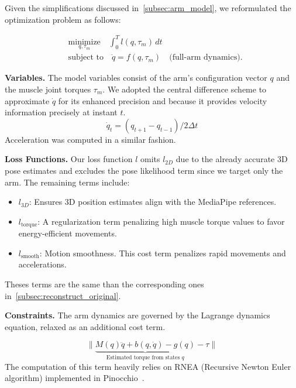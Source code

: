 Given the simplifications discussed in~\cref{subsec:arm_model}, we reformulated the optimization problem as follows:

\begin{equation*}
    \begin{aligned}
        & \underset{q,\tau_m}{\text{minimize}} \quad \int_{0}^{T} l(q, \tau_m)\, dt \\
        & \text{subject to} \quad \dot{q} = f(q, \tau_m) \quad \text{(full-arm dynamics)}.
    \end{aligned}
\end{equation*}

\noindent\textbf{Variables.} The model variables consist of the arm's configuration vector \(q\) and the muscle joint torques \(\tau_m\). 
We adopted the central difference scheme to approximate \(\dot{q}\) for its enhanced precision and because it provides velocity information precisely 
at instant \(t\).
\[
    \dot{q}_t = (q_{t + 1} - q_{t - 1}) / 2\Delta t
\]
Acceleration was computed in a similar fashion.

\noindent\textbf{Loss Functions.} Our loss function \(l\) omits \(l_{2D}\) due to the already accurate 3D pose estimates and 
excludes the pose likelihood term since we target only the arm. The remaining terms include:

\begin{itemize}
    \item 
        \(l_{3D}\): Ensures 3D position estimates align with the MediaPipe references.
    \item
        \(l_{\text{torque}}\): A regularization term penalizing high muscle torque values to favor energy-efficient movements.
    \item 
        \(l_{\text{smooth}}\): Motion smoothness.
        This cost term penalizes rapid movements and accelerations.
\end{itemize}

Theses terms are the same than the corresponding ones in~\cref{subsec:reconstruct_original}.

\noindent\textbf{Constraints.} The arm dynamics are governed by the Lagrange dynamics equation,
relaxed as an additional cost term.

\[
    \| \underbrace{M(q)\ddot{q} + b(q, \dot{q}) - g(q)}_{\textrm{Estimated torque from states $q$}} - \tau \|
\]
The computation of this term heavily relies on RNEA (Recursive Newton Euler algorithm) implemented in Pinocchio~\cite{carpentier2019pinocchio}.

